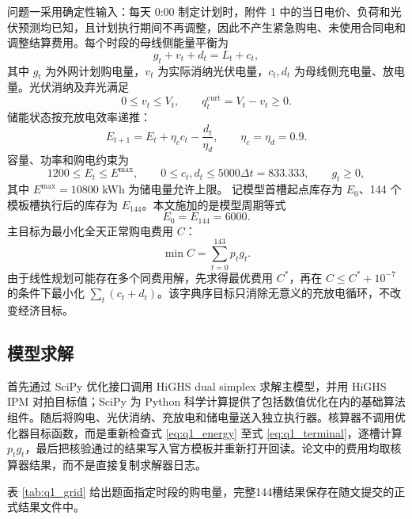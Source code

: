 \documentclass[withoutpreface,bwprint]{cumcmthesis}
\begin{document}
问题一采用确定性输入：每天 0:00 制定计划时，附件 1 中的当日电价、负荷和光伏预测均已知，且计划执行期间不再调整，因此不产生紧急购电、未使用合同电和调整结算费用。每个时段的母线侧能量平衡为
\begin{equation}
g_t+v_t+d_t=L_t+c_t, \label{eq:q1_balance}
\end{equation}
其中 $g_t$ 为外网计划购电量，$v_t$ 为实际消纳光伏电量，$c_t,d_t$ 为母线侧充电量、放电量。光伏消纳及弃光满足
\begin{equation}
0\le v_t\le V_t,\qquad q_t^{\mathrm{curt}}=V_t-v_t\ge0. \label{eq:q1_pv}
\end{equation}
储能状态按充放电效率递推：
\begin{equation}
E_{t+1}=E_t+\eta_c c_t-\frac{d_t}{\eta_d},\qquad
\eta_c=\eta_d=0.9. \label{eq:q1_soc}
\end{equation}
容量、功率和购电约束为
\begin{equation}
1200\le E_t\le E^{\max},\qquad
0\le c_t,d_t\le5000\Delta t=833.333,\qquad
g_t\ge0, \label{eq:q1_bounds}
\end{equation}
其中 $E^{\max}=10800$ kWh 为储电量允许上限。
记模型首槽起点库存为 $E_0$、144 个模板槽执行后的库存为 $E_{144}$。本文施加的是模型周期等式
\begin{equation}
E_0=E_{144}=6000. \label{eq:q1_terminal}
\end{equation}
主目标为最小化全天正常购电费用 $C$：
\begin{equation}
\min C=\sum_{t=0}^{143}p_tg_t. \label{eq:q1_obj}
\end{equation}
由于线性规划可能存在多个同费用解，先求得最优费用 $C^*$，再在 $C\le C^*+10^{-7}$ 的条件下最小化 $\sum_t(c_t+d_t)$。该字典序目标只消除无意义的充放电循环，不改变经济目标。

\subsection{模型求解}

首先通过 SciPy 优化接口调用 HiGHS dual simplex 求解主模型，并用 HiGHS IPM 对拍目标值；SciPy 为 Python 科学计算提供了包括数值优化在内的基础算法组件\cite{virtanen2020scipy}。随后将购电、光伏消纳、充放电和储电量送入独立执行器。核算器不调用优化器目标函数，而是重新检查式 \eqref{eq:q1_energy} 至式 \eqref{eq:q1_terminal}，逐槽计算 $p_tg_t$，最后把核验通过的结果写入官方模板并重新打开回读。论文中的费用均取核算器结果，而不是直接复制求解器日志。

表 \ref{tab:q1_grid} 给出题面指定时段的购电量，完整144槽结果保存在随文提交的正式结果文件中。
\end{document}
